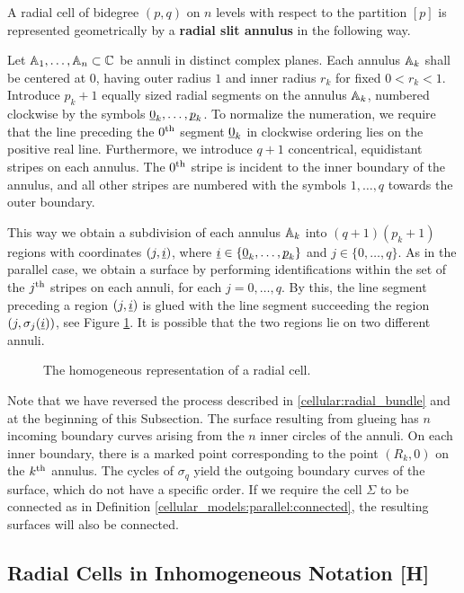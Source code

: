 A radial cell of bidegree $(p, q)$ on $n$ levels with respect to the partition $[p]$ is represented geometrically by a \textbf{radial slit annulus} in the following way.

Let $\mathbb A_1, \dotsc, \mathbb A_n \subset \mathbb C$ be annuli in distinct complex planes.
Each annulus $\mathbb A_k$ shall be centered at $0$, having outer radius $1$ and inner radius $r_k$ for fixed $0 < r_k < 1$.
Introduce $p_k+1$ equally sized radial segments on the annulus $\mathbb A_k$, numbered clockwise by the symbols $\underline{\smash{0}}_k, \dotsc, \underline{\smash{p}}_k$.
To normalize the numeration, we require that the line preceding the $0^{\text{th}}$ segment $\underline{\smash{0}}_k$ in clockwise ordering lies on the positive real line.
Furthermore, we introduce $q+1$ concentrical, equidistant stripes on each annulus. 
The $0^{\text{th}}$ stripe is incident to the inner boundary of the annulus,
and all other stripes are numbered with the symbols $1, \dotsc, q$ towards the outer boundary.

This way we obtain a subdivision of each annulus $\mathbb A_k$ into $(q+1)(p_k+1)$ regions with coordinates $(j, \underline{\smash{i}})$, 
where $\underline{\smash{i}} \in \{\underline{\smash{0}}_k, \dotsc, \underline{\smash{p}}_k\}$ and $j \in \{0, \dotsc, q\}$.
As in the parallel case, we obtain a surface by performing identifications within the set of the $j^{\text{th}}$ stripes on each annuli, for each $j = 0, \dotsc, q$.
By this, the line segment preceding a region $(j, \underline{\smash{i}})$ is glued with the line segment succeeding the region $(j, \sigma_j(\underline{\smash{i}}))$,
see Figure \ref{radial:slit_annuli:homogeneous_cell}.
It is possible that the two regions lie on two different annuli.

\begin{figure}[ht]
\centering
{}
\caption{\label{radial:slit_annuli:homogeneous_cell} The homogeneous representation of a radial cell.}
\end{figure}

Note that we have reversed the process described in \ref{cellular:radial_bundle} and at the beginning of this Subsection.
The surface resulting from glueing has $n$ incoming boundary curves arising from the $n$ inner circles of the annuli. 
On each inner boundary, there is a marked point corresponding to the point $(R_k, 0)$ on the $k^{\text{th}}$ annulus.
The cycles of $\sigma_q$ yield the outgoing boundary curves of the surface, which do not have a specific order.
If we require the cell $\Sigma$ to be connected as in Definition \ref{cellular_models:parallel:connected}, the resulting surfaces will also be connected.

\subsection{Radial Cells in Inhomogeneous Notation [H]}
\label{cellular_models:radial:cells_in_inhomogenous_notation}

